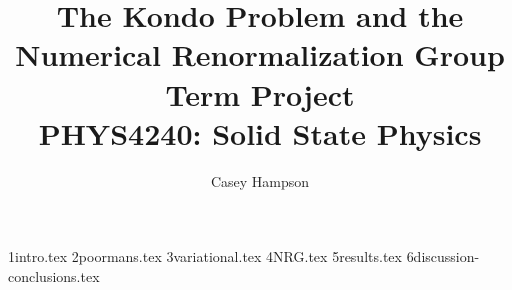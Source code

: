 \documentclass[titlepage]{article}
\title{The Kondo Problem and the Numerical Renormalization Group \\[5pt] Term Project \\[8pt] PHYS4240: Solid State Physics}
\author{Casey Hampson}
\numberwithin{equation}{section}
\numberwithin{figure}{section}
\begin{document}
    \maketitle
    \pagebreak
    \tableofcontents
    \pagebreak

    {1intro.tex}
    {2poormans.tex}
    {3variational.tex}
    {4NRG.tex}
    {5results.tex}
    {6discussion-conclusions.tex}

    \pagebreak
    \nocite{*}
    \printbibliography
\end{document}
